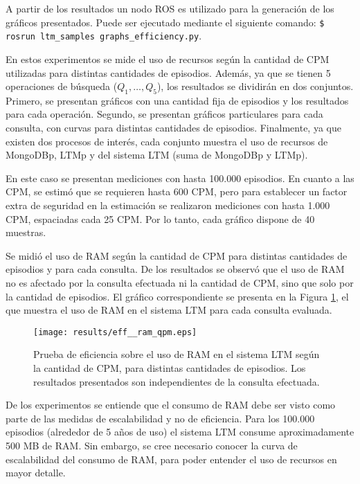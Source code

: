 A partir de los resultados un nodo ROS es utilizado para la generación de los gráficos presentados. Puede ser ejecutado mediante el siguiente comando:
\texttt{\$ rosrun ltm\_samples graphs\_efficiency.py}.

En estos experimentos se mide el uso de recursos según la cantidad de CPM utilizadas para distintas cantidades de episodios. Además, ya que se tienen 5 operaciones de búsqueda ($Q_1,\ldots,Q_5$), los resultados se dividirán en dos conjuntos. Primero, se presentan gráficos con una cantidad fija de episodios y los resultados para cada operación. Segundo, se presentan gráficos particulares para cada consulta, con curvas para distintas cantidades de episodios. Finalmente, ya que existen dos procesos de interés, cada conjunto muestra el uso de recursos de MongoDBp, LTMp y del sistema LTM (suma de MongoDBp y LTMp).

En este caso se presentan mediciones con hasta 100.000 episodios. En cuanto a las CPM, se estimó que se requieren hasta 600 CPM, pero para establecer un factor extra de seguridad en la estimación se realizaron mediciones con hasta 1.000 CPM, espaciadas cada 25 CPM. Por lo tanto, cada gráfico dispone de 40 muestras.


Se midió el uso de RAM según la cantidad de CPM para distintas cantidades de episodios y para cada consulta. De los resultados se observó que el uso de RAM no es afectado por la consulta efectuada ni la cantidad de CPM, sino que solo por la cantidad de episodios. El gráfico correspondiente se presenta en la Figura \ref{result:eff__ram_qpm}, el que muestra el uso de RAM en el sistema LTM para cada consulta evaluada.

\begin{figure}[!ht]
	\centering
	\texttt{[image: results/eff\_\_ram\_qpm.eps]}
	\caption[Eficiencia: Uso de RAM según CPM, cantidad variable de episodios.]
	{\small Prueba de eficiencia sobre el uso de RAM en el sistema LTM según la cantidad de CPM, para distintas cantidades de episodios. Los resultados presentados son independientes de la consulta efectuada.}
	\label{result:eff__ram_qpm}
\end{figure}

De los experimentos se entiende que el consumo de RAM debe ser visto como parte de las medidas de escalabilidad y no de eficiencia. Para los 100.000 episodios (alrededor de 5 años de uso) el sistema LTM consume aproximadamente 500 MB de RAM. Sin embargo, se cree necesario conocer la curva de escalabilidad del consumo de RAM, para poder entender el uso de recursos en mayor detalle.


